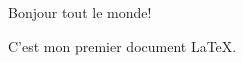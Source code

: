 \documentclass{article}
\begin{document}
	Bonjour tout le monde!

	C'est mon premier document LaTeX.
\end{document}
